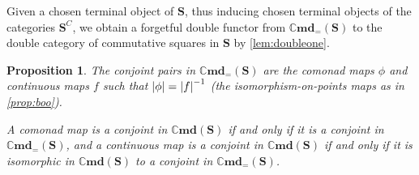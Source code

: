 \documentclass[11pt, oneside, article]{memoir}
\theoremstyle{plain}
\newtheorem{proposition}[theorem]{Proposition}
\theoremstyle{definition}
\theoremstyle{remark}
\newenvironment{remark}
{\renewcommand\qedsymbol{$\lrcorner$}%
  \pushQED{\qed}\myremark}
{\popQED\endmyremark}
\DeclarePairedDelimiter{\abs}{\lvert}{\rvert}
\newcommand{\namedcat}[1]{\mathbf{#1}}
\newcommand{\cat}[1]{\mathbf{#1}}
\newcommand{\Cmd}{\mathbb{C}\namedcat{md}}
\newcommand{\CmdId}{\Cmd_=}
\newcommand{\CoalgOn}[2]{{#2}^{#1}}
\newcommand{\CoalgS}[1]{\CoalgOn{#1}{\bS}}
\newcommand{\pts}[1]{{\abs{#1}}}
\newcommand{\one}[1]{\pts{#1}}
\newcommand{\cmnd}[1]{{#1}}
\newcommand{\cC}{\cmnd{C}}
\newcommand{\bS}{\cat{S}}
\newcommand{\CS}{\CoalgS{\cC}}
\begin{document}
\begin{remark}
  Given a chosen terminal object of $\bS$, thus inducing chosen
  terminal objects of the categories $\CS$, we obtain a forgetful
  double functor from $\CmdId(\bS)$ to the double category of
  commutative squares in $\bS$ by \cref{lem:doubleone}.
\end{remark}

\begin{proposition}\label{prop:conjoint}
  The conjoint pairs in $\CmdId(\bS)$ are the comonad maps $\phi$ and
  continuous maps $f$ such that $\one{\phi} = \one{f}^{-1}$ (the
  isomorphism-on-points maps as in \cref{prop:boo}).

  A comonad map is a conjoint in $\Cmd(\bS)$ if and only if it is a
  conjoint in $\CmdId(\bS)$, and a continuous map is a conjoint in $\Cmd(\bS)$ if
  and only if it is isomorphic in $\Cmd(\bS)$ to a conjoint in $\CmdId(\bS)$.
\end{proposition}
\end{document}

